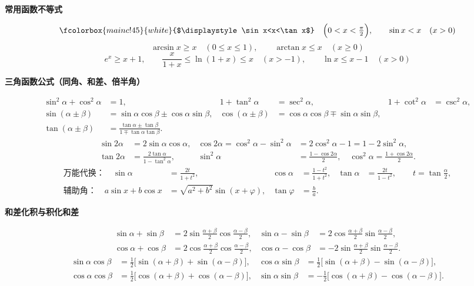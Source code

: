 \documentclass[11pt,a4paper]{ctexart}
\newcommand{\hd}[1]{\textbf{\color{mainc!85!black}#1}\par\nobreak\nopagebreak[4]}
\newcommand{\bx}[1]{{\setlength{\fboxsep}{3.4pt}\setlength{\fboxrule}{0.6pt}%
  \fcolorbox{mainc!45}{white}{$\displaystyle #1$}}}
\begin{document}
\begin{secbox}[一、函数、极限与连续]
\hd{常用函数不等式}
\begin{formbox}
\[
\bx{\sin x<x<\tan x}\quad\Bigl(0<x<\tfrac{\pi}{2}\Bigr),\qquad
\sin x<x\quad(x>0)
\]
\[
\arcsin x\ge x\quad(0\le x\le1),\qquad
\arctan x\le x\quad(x\ge0)
\]
\[
e^{x}\ge x+1,\qquad
\frac{x}{1+x}\le\ln(1+x)\le x\quad(x>-1),\qquad
\ln x\le x-1\quad(x>0)
\]
\end{formbox}

\hd{三角函数公式（同角、和差、倍半角）}
\begin{formbox}
\renewcommand{\arraystretch}{1.7}
\[
\begin{aligned}
\sin^{2}\alpha+\cos^{2}\alpha&=1, & 1+\tan^{2}\alpha&=\sec^{2}\alpha, & 1+\cot^{2}\alpha&=\csc^{2}\alpha,\\[2pt]
\sin(\alpha\pm\beta)&=\sin\alpha\cos\beta\pm\cos\alpha\sin\beta,
& \cos(\alpha\pm\beta)&=\cos\alpha\cos\beta\mp\sin\alpha\sin\beta,\\[2pt]
\tan(\alpha\pm\beta)&=\frac{\tan\alpha\pm\tan\beta}{1\mp\tan\alpha\tan\beta}.
\end{aligned}
\]
\[
\begin{aligned}
\sin 2\alpha&=2\sin\alpha\cos\alpha,
&\cos 2\alpha=\cos^{2}\alpha-\sin^{2}\alpha&=2\cos^{2}\alpha-1=1-2\sin^{2}\alpha,\\[2pt]
\tan 2\alpha&=\frac{2\tan\alpha}{1-\tan^{2}\alpha},
& \sin^{2}\alpha&=\frac{1-\cos 2\alpha}{2},\quad
\cos^{2}\alpha=\frac{1+\cos 2\alpha}{2}.
\end{aligned}
\]
\[
\begin{aligned}
\text{万能代换：}\quad
\sin\alpha&=\frac{2t}{1+t^{2}}, &
\cos\alpha&=\frac{1-t^{2}}{1+t^{2}}, &
\tan\alpha&=\frac{2t}{1-t^{2}},\qquad t=\tan\frac{\alpha}{2},\\[3pt]
\text{辅助角：}\quad
a\sin x+b\cos x&=\sqrt{a^{2}+b^{2}}\sin(x+\varphi),
&\tan\varphi&=\frac ba .
\end{aligned}
\]
\end{formbox}

\hd{和差化积与积化和差}
\begin{formbox}
\renewcommand{\arraystretch}{1.7}
\[
\begin{aligned}
\sin\alpha+\sin\beta&=2\sin\frac{\alpha+\beta}{2}\cos\frac{\alpha-\beta}{2},
& \sin\alpha-\sin\beta&=2\cos\frac{\alpha+\beta}{2}\sin\frac{\alpha-\beta}{2},\\[3pt]
\cos\alpha+\cos\beta&=2\cos\frac{\alpha+\beta}{2}\cos\frac{\alpha-\beta}{2},
& \cos\alpha-\cos\beta&=-2\sin\frac{\alpha+\beta}{2}\sin\frac{\alpha-\beta}{2}.
\end{aligned}
\]
\[
\begin{aligned}
\sin\alpha\cos\beta&=\tfrac12\bigl[\sin(\alpha+\beta)+\sin(\alpha-\beta)\bigr],
& \cos\alpha\sin\beta&=\tfrac12\bigl[\sin(\alpha+\beta)-\sin(\alpha-\beta)\bigr],\\[3pt]
\cos\alpha\cos\beta&=\tfrac12\bigl[\cos(\alpha+\beta)+\cos(\alpha-\beta)\bigr],
& \sin\alpha\sin\beta&=-\tfrac12\bigl[\cos(\alpha+\beta)-\cos(\alpha-\beta)\bigr].
\end{aligned}
\]
\end{formbox}


\end{secbox}
\end{document}
